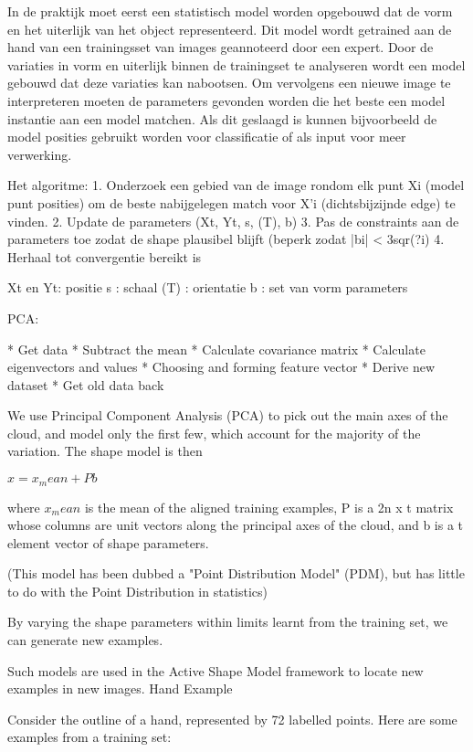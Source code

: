 In de praktijk moet eerst een statistisch model worden opgebouwd dat de vorm en het uiterlijk van het object representeerd. Dit model wordt getrained aan de hand van een trainingsset van images geannoteerd door een expert. Door de variaties in vorm en uiterlijk binnen de trainingset te analyseren wordt een model gebouwd dat deze variaties kan nabootsen. Om vervolgens een nieuwe image te interpreteren moeten de parameters gevonden worden die het beste een model instantie aan een model matchen. Als dit geslaagd is kunnen bijvoorbeeld de model posities gebruikt worden voor classificatie of als input voor meer verwerking.

Het algoritme: 1. Onderzoek een gebied van de image rondom elk punt Xi (model punt posities) om de beste nabijgelegen match voor X'i (dichtsbijzijnde edge) te vinden. 2. Update de parameters (Xt, Yt, s, (T), b) 3. Pas de constraints aan de parameters toe zodat de shape plausibel blijft (beperk zodat |bi| < 3sqr(?i) 4. Herhaal tot convergentie bereikt is

Xt en Yt: positie s : schaal (T) : orientatie b : set van vorm parameters

PCA:

    * Get data
    * Subtract the mean
    * Calculate covariance matrix
    * Calculate eigenvectors and values
    * Choosing and forming feature vector
    * Derive new dataset
    * Get old data back 
    
    
We use Principal Component Analysis (PCA) to pick out the main axes of the cloud, and model only the first few, which account for the majority of the variation.
The shape model is then

$x = x_mean + Pb$

where $x_mean$ is the mean of the aligned training examples, P is a 2n x t matrix whose columns are unit vectors along the principal axes of the cloud, and b is a t element vector of shape parameters.

(This model has been dubbed a "Point Distribution Model" (PDM), but has little to do with the Point Distribution in statistics)

By varying the shape parameters within limits learnt from the training set, we can generate new examples.

Such models are used in the Active Shape Model framework to locate new examples in new images.
Hand Example

Consider the outline of a hand, represented by 72 labelled points.
Here are some examples from a training set:

